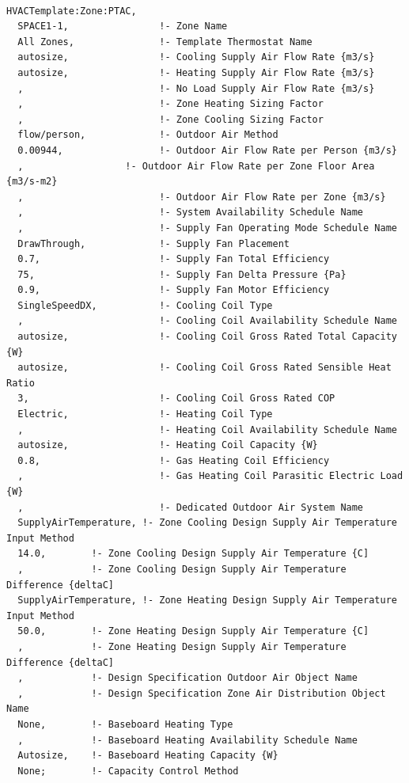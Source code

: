 \begin{lstlisting}

HVACTemplate:Zone:PTAC,
  SPACE1-1,                !- Zone Name
  All Zones,               !- Template Thermostat Name
  autosize,                !- Cooling Supply Air Flow Rate {m3/s}
  autosize,                !- Heating Supply Air Flow Rate {m3/s}
  ,                        !- No Load Supply Air Flow Rate {m3/s}
  ,                        !- Zone Heating Sizing Factor
  ,                        !- Zone Cooling Sizing Factor
  flow/person,             !- Outdoor Air Method
  0.00944,                 !- Outdoor Air Flow Rate per Person {m3/s}
  ,                  !- Outdoor Air Flow Rate per Zone Floor Area {m3/s-m2}
  ,                        !- Outdoor Air Flow Rate per Zone {m3/s}
  ,                        !- System Availability Schedule Name
  ,                        !- Supply Fan Operating Mode Schedule Name
  DrawThrough,             !- Supply Fan Placement
  0.7,                     !- Supply Fan Total Efficiency
  75,                      !- Supply Fan Delta Pressure {Pa}
  0.9,                     !- Supply Fan Motor Efficiency
  SingleSpeedDX,           !- Cooling Coil Type
  ,                        !- Cooling Coil Availability Schedule Name
  autosize,                !- Cooling Coil Gross Rated Total Capacity {W}
  autosize,                !- Cooling Coil Gross Rated Sensible Heat Ratio
  3,                       !- Cooling Coil Gross Rated COP
  Electric,                !- Heating Coil Type
  ,                        !- Heating Coil Availability Schedule Name
  autosize,                !- Heating Coil Capacity {W}
  0.8,                     !- Gas Heating Coil Efficiency
  ,                        !- Gas Heating Coil Parasitic Electric Load {W}
  ,                        !- Dedicated Outdoor Air System Name
  SupplyAirTemperature, !- Zone Cooling Design Supply Air Temperature Input Method
  14.0,        !- Zone Cooling Design Supply Air Temperature {C]
  ,            !- Zone Cooling Design Supply Air Temperature Difference {deltaC]
  SupplyAirTemperature, !- Zone Heating Design Supply Air Temperature Input Method
  50.0,        !- Zone Heating Design Supply Air Temperature {C]
  ,            !- Zone Heating Design Supply Air Temperature Difference {deltaC]
  ,            !- Design Specification Outdoor Air Object Name
  ,            !- Design Specification Zone Air Distribution Object Name
  None,        !- Baseboard Heating Type
  ,            !- Baseboard Heating Availability Schedule Name
  Autosize,    !- Baseboard Heating Capacity {W}
  None;        !- Capacity Control Method
\end{lstlisting}

